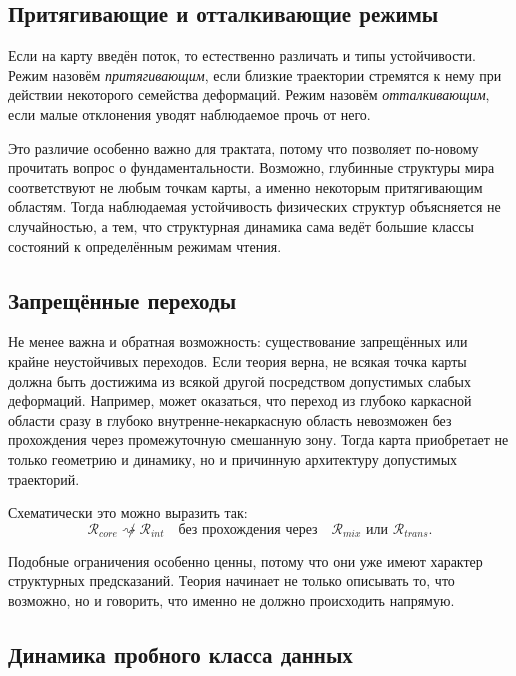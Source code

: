 \documentclass[12pt,a4paper]{article}
\begin{document}
\subsection{Притягивающие и отталкивающие режимы}

Если на карту введён поток, то естественно различать и типы устойчивости. Режим назовём \textit{притягивающим}, если близкие траектории стремятся к нему при действии некоторого семейства деформаций. Режим назовём \textit{отталкивающим}, если малые отклонения уводят наблюдаемое прочь от него.

Это различие особенно важно для трактата, потому что позволяет по-новому прочитать вопрос о фундаментальности. Возможно, глубинные структуры мира соответствуют не любым точкам карты, а именно некоторым притягивающим областям. Тогда наблюдаемая устойчивость физических структур объясняется не случайностью, а тем, что структурная динамика сама ведёт большие классы состояний к определённым режимам чтения.

\subsection{Запрещённые переходы}

Не менее важна и обратная возможность: существование запрещённых или крайне неустойчивых переходов. Если теория верна, не всякая точка карты должна быть достижима из всякой другой посредством допустимых слабых деформаций. Например, может оказаться, что переход из глубоко каркасной области сразу в глубоко внутренне-некаркасную область невозможен без прохождения через промежуточную смешанную зону. Тогда карта приобретает не только геометрию и динамику, но и причинную архитектуру допустимых траекторий.

Схематически это можно выразить так:
\begin{equation}
\mathcal{R}_{core} \not\rightsquigarrow \mathcal{R}_{int}
\quad \text{без прохождения через} \quad
\mathcal{R}_{mix} \text{ или } \mathcal{R}_{trans}.
\end{equation}

Подобные ограничения особенно ценны, потому что они уже имеют характер структурных предсказаний. Теория начинает не только описывать то, что возможно, но и говорить, что именно не должно происходить напрямую.

\subsection{Динамика пробного класса данных}
\end{document}
